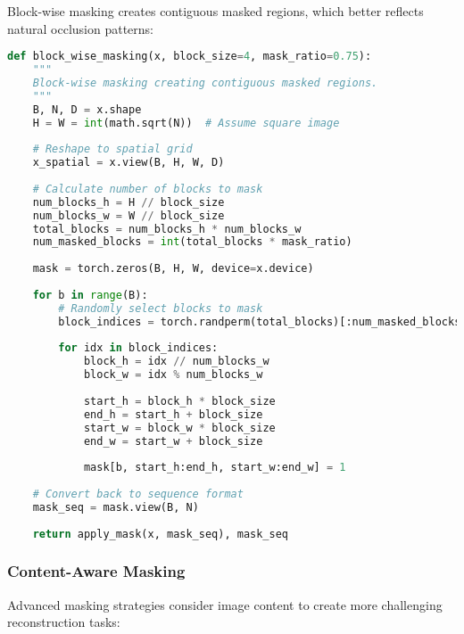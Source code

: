 Block-wise masking creates contiguous masked regions, which better reflects natural occlusion patterns:

\begin{lstlisting}[language=Python, caption=Block-wise masking for structured visual learning]
def block_wise_masking(x, block_size=4, mask_ratio=0.75):
    """
    Block-wise masking creating contiguous masked regions.
    """
    B, N, D = x.shape
    H = W = int(math.sqrt(N))  # Assume square image
    
    # Reshape to spatial grid
    x_spatial = x.view(B, H, W, D)
    
    # Calculate number of blocks to mask
    num_blocks_h = H // block_size
    num_blocks_w = W // block_size
    total_blocks = num_blocks_h * num_blocks_w
    num_masked_blocks = int(total_blocks * mask_ratio)
    
    mask = torch.zeros(B, H, W, device=x.device)
    
    for b in range(B):
        # Randomly select blocks to mask
        block_indices = torch.randperm(total_blocks)[:num_masked_blocks]
        
        for idx in block_indices:
            block_h = idx // num_blocks_w
            block_w = idx % num_blocks_w
            
            start_h = block_h * block_size
            end_h = start_h + block_size
            start_w = block_w * block_size
            end_w = start_w + block_size
            
            mask[b, start_h:end_h, start_w:end_w] = 1
    
    # Convert back to sequence format
    mask_seq = mask.view(B, N)
    
    return apply_mask(x, mask_seq), mask_seq
\end{lstlisting}

\subsubsection{Content-Aware Masking}

Advanced masking strategies consider image content to create more challenging reconstruction tasks:

